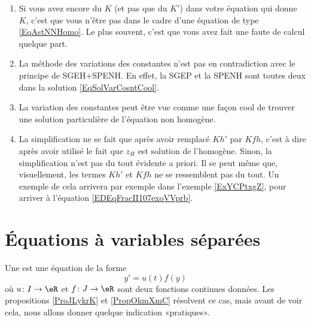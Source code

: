 \begin{enumerate}
\item
Si vous avez encore du $K$ (et pas que du $K'$) dans votre équation qui donne $K$, c'est que vous n'être pas dans le cadre d'une équation de type \eqref{EqAstNNHomo}. Le plus souvent, c'est que vous avez fait une faute de calcul quelque part.

\item
La méthode des variations des constantes n'est pas en contradiction avec le principe de \og SGEH+SPENH\fg. En effet, la SGEP et la SPENH sont toutes deux dans la solution \eqref{EqSolVarCosntCool}.

\item
La variation des constantes peut être vue comme une façon cool de trouver une solution particulière de l'équation non homogène.

\item
    La simplification ne se fait que après avoir remplacé $Kh'$ par $Kfh$, c'est à dire après avoir utilisé le fait que $z_H$ est solution de l'homogène. Sinon, la simplification n'est pas du tout évidente a priori. Il se peut même que, visuellement, les termes $Kh'$ et $Kfh$ ne se ressemblent pas du tout. Un exemple de cela arrivera par exemple dans l'exemple \ref{ExYCPtxgZ}, pour arriver à l'équation \eqref{EDEqFracII107exoVVprb}.

\end{enumerate}


\section{Équations à variables séparées}
\label{Secvarsep}

Une  est une équation  de la forme
\begin{equation}		\label{EqDiffSeparee}
	y'=u(t)f(y)
\end{equation}
où $u\colon I\to \eR$ et $f\colon J\to \eR$ sont deux fonctions continues données. Les propositions \ref{ProJLykrK} et \ref{PropOkmXmC} résolvent ce cas, mais avant de voir cela, nous allons donner quelque indication «pratiques».

